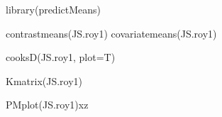 library(predictMeans)

contrastmeans(JS.roy1) 
covariatemeans(JS.roy1)

cooksD(JS.roy1, plot=T)

Kmatrix(JS.roy1)

PMplot(JS.roy1)xz
